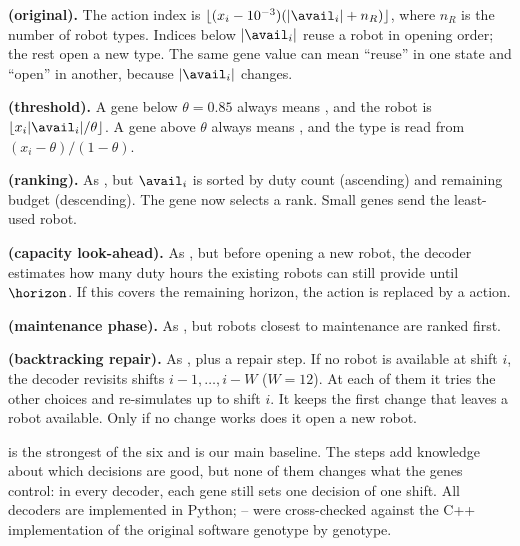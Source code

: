 \textbf{ (original).}
The action index is $\lfloor (x_i - 10^{-3})(|\avail_i| + n_R) \rfloor$,
where $n_R$ is the number of robot types. Indices below $|\avail_i|$ reuse a robot in opening order; the rest open a new type.
The same gene value can mean ``reuse'' in one state and ``open'' in another, because $|\avail_i|$ changes.

\textbf{ (threshold).}
A gene below $\theta = 0.85$ always means \reuse, and the robot is $\lfloor x_i |\avail_i| / \theta \rfloor$.
A gene above $\theta$ always means \new, and the type is read from $(x_i - \theta)/(1-\theta)$.

\textbf{ (ranking).}
As , but $\avail_i$ is sorted by duty count (ascending) and remaining budget (descending).
The gene now selects a rank. Small genes send the least-used robot.

\textbf{ (capacity look-ahead).}
As , but before opening a new robot, the decoder estimates how many duty hours the existing robots can still provide until $\horizon$.
If this covers the remaining horizon, the \new action is replaced by a \reuse action.

\textbf{ (maintenance phase).}
As , but robots closest to maintenance are ranked first.

\textbf{ (backtracking repair).}
As , plus a repair step.
If no robot is available at shift $i$, the decoder revisits shifts $i-1, \dots, i-W$ ($W = 12$).
At each of them it tries the other \reuse choices and re-simulates up to shift $i$.
It keeps the first change that leaves a robot available.
Only if no change works does it open a new robot.

 is the strongest of the six and is our main baseline.
The steps add knowledge about which decisions are good, but none of them changes what the genes control:
in every decoder, each gene still sets one decision of one shift.
All decoders are implemented in Python; -- were cross-checked against the C++ implementation of the original software genotype by genotype.
